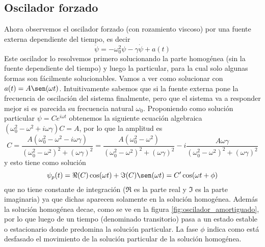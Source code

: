 \documentclass[a4paper]{article}
\numberwithin{equation}{section}
\begin{document}
    \subsection{Oscilador forzado}
	Ahora observemos el oscilador forzado (con rozamiento viscoso) por una fuente externa dependiente del tiempo, es decir
    \begin{equation}
        \ddot{\psi} = - \omega_0^2 \psi - \gamma \dot{\psi} + a(t)
        \label{eq:oscilador_forzado}
    \end{equation}
	Este oscilador lo resolvemos primero solucionando la parte homogénea (sin la fuente dependiente del tiempo) y luego la particular, para la cual solo algunas formas son fácilmente solucionables. Vamos a ver como solucionar con $a(t) = A \sen(\omega t)$. Intuitivamente sabemos que si la fuente externa pone la frecuencia de oscilación del sistema finalmente, pero que el sistema va a responder mejor si es parecida su frecuencia natural $\omega_0$. Proponiendo como solución particular $\psi = C e^{i \omega t}$ obtenemos la siguiente ecuación algebraica $(\omega_0^2 - \omega^2 + i \omega \gamma) C = A$, por lo que la amplitud es
	\begin{equation}
		C = \frac{A (\omega_0^2 - \omega^2 - i \omega \gamma)}{(\omega_0^2 - \omega^2)^2 + (\omega \gamma)^2} = \frac{A (\omega_0^2 - \omega^2)}{(\omega_0^2 - \omega^2)^2 + (\omega \gamma)^2} - i \frac{A \omega \gamma}{(\omega_0^2 - \omega^2)^2 + (\omega \gamma)^2}
		\label{eq:oscilador_forzado_particular_amplitud}
	\end{equation}
	y esto tiene como solución
	\begin{equation}
		\psi_p(t) = \Re(C) \cos(\omega t) + \Im(C) \sen(\omega t) = C' \cos(\omega t + \phi)
		\label{eq:oscilador_forzado_particular_solucion}
	\end{equation}
	que no tiene constante de integración ($\Re$ es la parte real y $\Im$ es la parte imaginaria) ya que dichas aparecen solamente en la solución homogénea. Además la solución homogénea decae, como se ve en la figura \ref{fig:oscilador_amortiguado}, por lo que luego de un tiempo (denominado transitorio) pasa a un estado estable o estacionario donde predomina la solución particular. La fase $\phi$ indica como está desfasado el movimiento de la solución particular de la solución homogénea.
\end{document}
